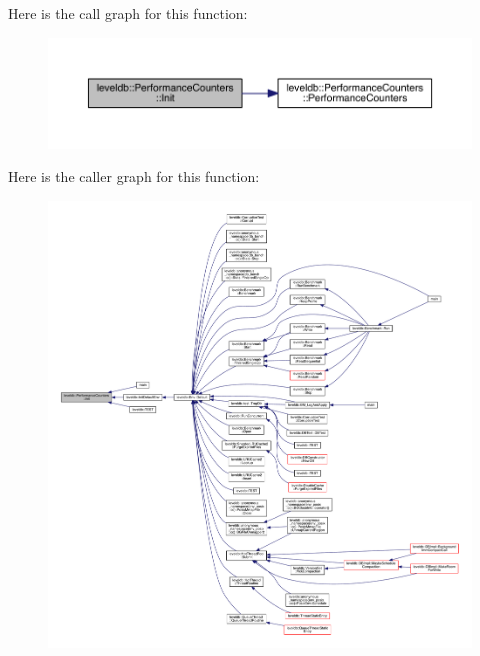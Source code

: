 Here is the call graph for this function\+:\nopagebreak
\begin{figure}[H]
\begin{center}
\leavevmode
\includegraphics[width=350pt]{structleveldb_1_1_performance_counters_a9189ae5525f22a8c93515edd9f63195e_cgraph}
\end{center}
\end{figure}




Here is the caller graph for this function\+:
\nopagebreak
\begin{figure}[H]
\begin{center}
\leavevmode
\includegraphics[width=350pt]{structleveldb_1_1_performance_counters_a9189ae5525f22a8c93515edd9f63195e_icgraph}
\end{center}
\end{figure}


\hypertarget{structleveldb_1_1_performance_counters_af9c0e39cf2512f4ebe1069af8837e073}{}
